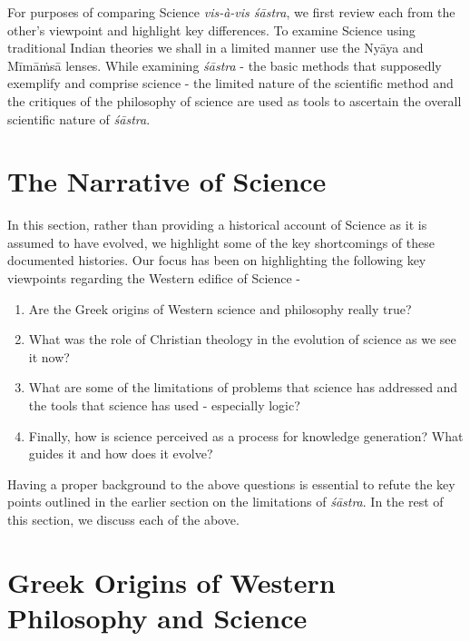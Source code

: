 For purposes of comparing Science \textit{vis-à-vis śāstra}, we first review each from the other’s viewpoint and highlight key differences. To examine Science using traditional Indian theories we shall in a limited manner use the Nyāya and Mīmāṁsā lenses. While examining \textit{śāstra} - the basic methods that supposedly exemplify and comprise science - the limited nature of the scientific method and the critiques of the philosophy of science are used as tools to ascertain the overall scientific nature of \textit{śāstra}.


\section*{The Narrative of Science }

In this section, rather than providing a historical account of Science as it is assumed to have evolved, we highlight some of the key shortcomings of these documented histories. Our focus has been on highlighting the following key viewpoints regarding the Western edifice of Science -
\begin{enumerate}[topsep=0pt]
\itemsep=0pt
\item Are the Greek origins of Western science and philosophy really true?

 \item What was the role of Christian theology in the evolution of science as we see it now?

 \item What are some of the limitations of problems that science has addressed and the tools that science has used - especially logic?

 \item Finally, how is science perceived as a process for knowledge generation? What guides it and how does it evolve?

\end{enumerate}

Having a proper background to the above questions is essential to refute the key points outlined in the earlier section on the limitations of \textit{śāstra}. In the rest of this section, we discuss each of the above.


\section*{Greek Origins of Western Philosophy and Science}


